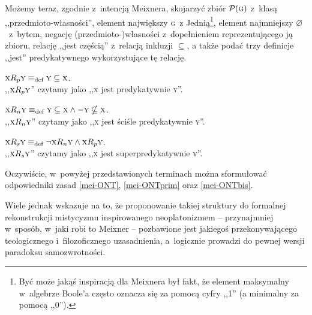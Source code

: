 Możemy teraz, zgodnie z~intencją Meixnera, skojarzyć zbiór $\mathcal{P}(\textsc{g})$ z~klasą ,,przedmioto-własności'', element największy \textsc{g}~z Jednią\footnote{Być może jakąś inspiracją dla Meixnera był fakt, że element maksymalny w~algebrze Boole'a często oznacza się za pomocą cyfry ,,1'' (a minimalny za pomocą ,,0'').}, element najmniejszy $\varnothing$~z~bytem, negację (przedmioto-)własności z~dopełnieniem reprezentującego ją zbioru, relację ,,jest częścią'' z~relacją inkluzji $\subseteq$, a także podać trzy definicje ,,jest'' predykatywnego wykorzystujące tę relację.
\begin{defin}
$\textsc{x}R_p\textsc{y} \equiv_{\text{def}}
\textsc{y} \subseteq \textsc{x}$.\\
,,$\textsc{x}R_p\textsc{y}$'' czytamy jako ,,\textsc{x} jest predykatywnie \textsc{y}''.
\end{defin}
\begin{defin}
$\textsc{x}R_n\textsc{y} \equiv_{\text{def}}
\textsc{y} \subseteq \textsc{x} \land -\textsc{y} \nsubseteq \textsc{x}$.\\
,,$\textsc{x}R_n\textsc{y}$'' czytamy jako ,,\textsc{x} jest ściśle predykatywnie \textsc{y}''.
\end{defin}
\begin{defin}
$\textsc{x}R_s\textsc{y} \equiv_{\text{def}}
\neg \textsc{x}R_n\textsc{y} \land \textsc{x}R_p\textsc{y}$.\\
,,$\textsc{x}R_s\textsc{y}$'' czytamy jako ,,\textsc{x} jest superpredykatywnie \textsc{y}''.
\end{defin}%
%
%
%
\noindent Oczywiście, w~powyżej przedstawionych terminach można sformułować odpowiedniki zasad \ref{mei-ONT}, \ref{mei-ONTprim} oraz \ref{mei-ONTbis}.

Wiele jednak wskazuje na to, że proponowanie takiej struktury do formalnej rekonstrukcji mistycyzmu inspirowanego neoplatonizmem -- przynajmniej w~sposób, w~jaki robi to Meixner -- pozbawione jest jakiegoś przekonywającego teologicznego i~filozoficznego uzasadnienia, a~logicznie prowadzi do pewnej wersji paradoksu samozwrotności.

